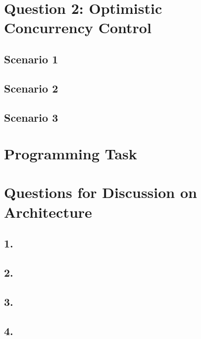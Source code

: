 \documentclass[12pt]{article}
\begin{document}
\section*{Question 2: Optimistic Concurrency Control}
\subsection*{Scenario 1}
\subsection*{Scenario 2}
\subsection*{Scenario 3}
\section*{Programming Task}
\section*{Questions for Discussion on Architecture} %
\subsection*{1.} %
\subsection*{2.} %
\subsection*{3.} %
\subsection*{4.} %
\end{document}
